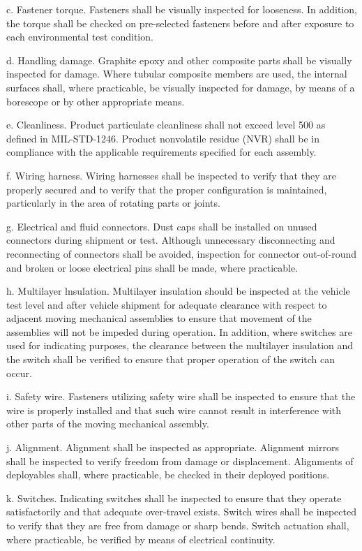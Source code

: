 \documentclass[12pt]{article}
\begin{document}
c. Fastener torque. 
Fasteners shall be visually inspected for looseness. 
In addition, the torque shall be checked on pre-selected fasteners before and after exposure to each environmental test condition.

d. Handling damage. 
Graphite epoxy and other composite parts shall be visually inspected for damage. 
Where tubular composite members are used, the internal surfaces shall, where practicable, be visually inspected for damage, by means of a borescope or by other appropriate means.

e. Cleanliness. 
Product particulate cleanliness shall not exceed level 500 as defined in MIL-STD-1246.
Product nonvolatile residue (NVR) shall be in compliance with the applicable requirements specified for each assembly.

f. Wiring harness. 
Wiring harnesses shall be inspected to verify that they are properly secured and to verify that the proper configuration is
maintained, particularly in the area of rotating parts or joints.

g. Electrical and fluid connectors. 
Dust caps shall be installed on unused connectors during shipment or test. 
Although unnecessary disconnecting and reconnecting of connectors shall be avoided, inspection for connector out-of-round and broken or loose electrical pins shall be made, where practicable.

h. Multilayer lnsulation. 
Multilayer insulation should be inspected at the vehicle test level and after vehicle shipment for adequate clearance with
respect to adjacent moving mechanical assemblies to ensure that movement of the assemblies will not be impeded during operation. 
In addition, where switches are used for indicating purposes, the clearance between the multilayer insulation and the switch shall be verified to ensure that proper operation of the switch can occur.

i. Safety wire. 
Fasteners utilizing safety wire shall be inspected to ensure that the wire is properly installed and that such wire cannot
result in interference with other parts of the moving mechanical assembly.

j. Alignment.
Alignment shall be inspected as appropriate.
Alignment mirrors shall be inspected to verify freedom from damage or displacement.
Alignments of deployables shall, where practicable, be checked in their deployed positions.

k. Switches. 
Indicating switches shall be inspected to ensure that they operate satisfactorily and that adequate over-travel exists. 
Switch wires shall be inspected to verify that they are free from damage or sharp bends. 
Switch actuation shall, where practicable, be verified by means of electrical continuity.
\end{document}
